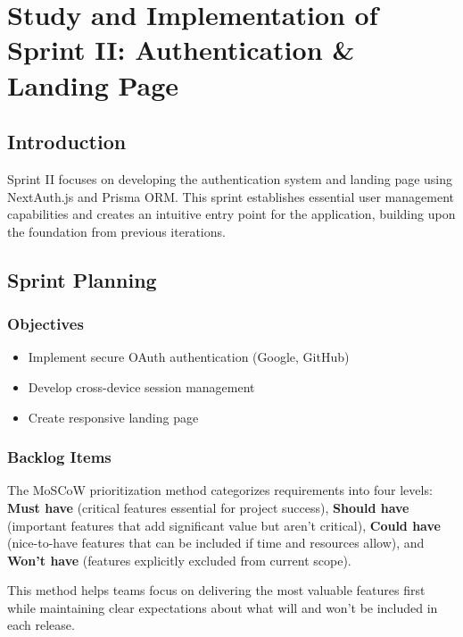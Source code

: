 \chapter[Sprint II]{Study and Implementation of Sprint II: Authentication \& Landing Page}

\section{Introduction}
Sprint II focuses on developing the authentication system and landing page using NextAuth.js and Prisma ORM. This sprint establishes essential user management capabilities and creates an intuitive entry point for the application, building upon the foundation from previous iterations.

\section{Sprint Planning}

\subsection{Objectives}
\begin{itemize}
    \item Implement secure OAuth authentication (Google, GitHub)
    \item Develop cross-device session management
    \item Create responsive landing page
\end{itemize}
\subsection{Backlog Items}

The MoSCoW prioritization method categorizes requirements into four levels: \textbf{Must have} (critical features essential for project success), \textbf{Should have} (important features that add significant value but aren't critical), \textbf{Could have} (nice-to-have features that can be included if time and resources allow), and \textbf{Won't have} (features explicitly excluded from current scope).

This method helps teams focus on delivering the most valuable features first while maintaining clear expectations about what will and won't be included in each release.


